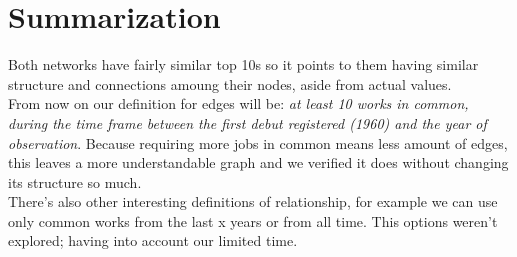 \section{Summarization}
Both networks have fairly similar top 10s so it points to them having similar structure and connections amoung their nodes, aside from actual values.\\

From now on our definition for edges will be: \textit{at least 10 works in common, during the time frame between the first debut registered (1960) and the year of observation}. Because requiring more jobs in common means less amount of edges, this leaves a more understandable graph and we verified it does without changing its structure so much.\\

There's also other interesting definitions of relationship, for example we can use only common works from the last x years or from all time. This options weren't explored; having into account our limited time.\\

